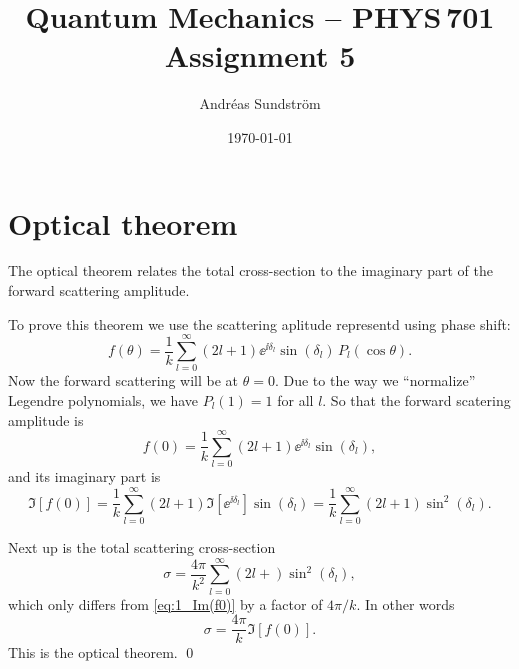 \documentclass[11pt,letter, swedish, english
]{article}
\begin{document}
\title{Quantum Mechanics -- PHYS\,701 \\
Assignment 5}
\author{Andréas Sundström}
\date{\today}

\maketitle



\section{Optical theorem}
The optical theorem relates the total cross-section to the imaginary
part of the forward scattering amplitude. 

To prove this theorem we use the scattering aplitude representd using
phase shift:
\begin{equation}
f(\theta)=\frac{1}{k}\sum_{l=0}^\infty
(2l+1)\ee^{\ii\delta_l}\sin(\delta_l)\,P_l(\cos\theta).
\end{equation}
Now the forward scattering will be at $\theta=0$. Due to the way
we ``normalize'' Legendre polynomials\footnotemark{}, we have $P_l(1)=1$
for all $l$. So that the forward scatering amplitude is
\begin{equation}
f(0)=\frac{1}{k}\sum_{l=0}^\infty
(2l+1)\ee^{\ii\delta_l}\sin(\delta_l),
\end{equation}
and its imaginary part is
\begin{equation}\label{eq:1_Im(f0)}
\Im[f(0)]=\frac{1}{k}\sum_{l=0}^\infty
(2l+1)\Im[\ee^{\ii\delta_l}]\sin(\delta_l)
=\frac{1}{k}\sum_{l=0}^\infty (2l+1)\sin^2(\delta_l).
\end{equation}


Next up is the total scattering cross-section
\begin{equation}
\sigma=\frac{4\pi}{k^2}\sum_{l=0}^\infty
(2l+)\sin^2(\delta_l),
\end{equation}
which only differs from \eqref{eq:1_Im(f0)} by a factor of
$4\pi/k$. In other words
\begin{equation}
\sigma=\frac{4\pi}{k}\Im[f(0)].
\end{equation}
This is the optical theorem.
\qed
\end{document}
